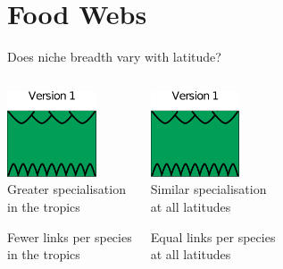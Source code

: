 \documentclass{beamer}
\begin{document}
\section*{Food Webs}
  \begin{frame}{Does niche breadth vary with latitude?}
    \begin{columns}
    \column{.5in}
    \column{1.75in}
      \begin{center}
      \includegraphics[height=1in]{Figures/version1.eps}\\
      \vspace{.5cm}
      Greater specialisation\\in the tropics

      \vspace{.25cm}
      {\color{white}Fewer links per species\\in the tropics}

      \end{center}
    \column{.5in}
    \column{1.75in}
      \begin{center}
      \includegraphics[height=1in]{Figures/version1.eps}\\
      \vspace{.5cm}
      Similar specialisation\\at all latitudes

      \vspace{.25cm}
      {\color{white}Equal links per species\\at all latitudes}

      \end{center}
    \column{.5in}
    \end{columns}

  \end{frame}
\end{document}
